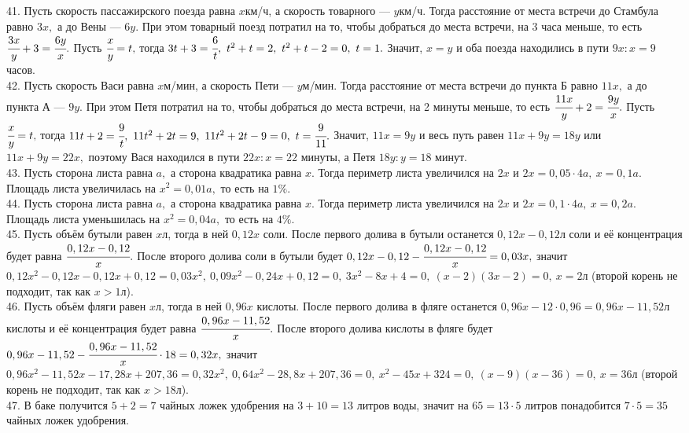 41. Пусть скорость пассажирского поезда равна $x$км/ч, а скорость товарного --- $y$км/ч. Тогда расстояние от места встречи до Стамбула равно $3x,$ а до Вены --- $6y.$ При этом товарный поезд потратил на то, чтобы добраться до места встречи, на 3 часа меньше, то есть $\cfrac{3x}{y}+3=\cfrac{6y}{x}.$ Пусть $\cfrac{x}{y}=t,$ тогда $3t+3=\cfrac{6}{t},\ t^2+t=2,\ t^2+t-2=0,\ t=1.$ Значит, $x=y$ и оба поезда находились в пути $9x:x=9$ часов.\\
42. Пусть скорость Васи равна $x$м/мин, а скорость Пети --- $y$м/мин. Тогда расстояние от места встречи до пункта Б равно $11x,$ а до пункта А --- $9y.$ При этом Петя потратил на то, чтобы добраться до места встречи, на 2 минуты меньше, то есть $\cfrac{11x}{y}+2=\cfrac{9y}{x}.$ Пусть $\cfrac{x}{y}=t,$ тогда $11t+2=\cfrac{9}{t},\ 11t^2+2t=9,\ 11t^2+2t-9=0,\ t=\cfrac{9}{11}.$ Значит, $11x=9y$ и весь путь равен $11x+9y=18y$ или $11x+9y=22x,$ поэтому Вася находился в пути $22x:x=22$ минуты, а Петя $18y:y=18$ минут.\\
43. Пусть сторона листа равна $a,$ а сторона квадратика равна $x.$ Тогда периметр листа увеличился на $2x$ и $2x=0,05\cdot4a,\ x=0,1a.$ Площадь листа увеличилась на $x^2=0,01a,$ то есть на $1\%.$\\
44. Пусть сторона листа равна $a,$ а сторона квадратика равна $x.$ Тогда периметр листа увеличился на $2x$ и $2x=0,1\cdot4a,\ x=0,2a.$ Площадь листа уменьшилась на $x^2=0,04a,$ то есть на $4\%.$\\
45. Пусть объём бутыли равен $x$л, тогда в ней $0,12x$ соли. После первого долива в бутыли останется $0,12x-0,12$л соли и её концентрация будет равна $\cfrac{0,12x-0,12}{x}.$ После второго долива соли в бутыли будет $0,12x-0,12-\cfrac{0,12x-0,12}{x}=0,03x,$ значит $0,12x^2-0,12x-0,12x+0,12=0,03x^2,\ 0,09x^2-0,24x+0,12=0,\ 3x^2-8x+4=0,\ (x-2)(3x-2)=0,\ x=2$л (второй корень не подходит, так как $x>1$л).\\
46. Пусть объём фляги равен $x$л, тогда в ней $0,96x$ кислоты. После первого долива в фляге останется $0,96x-12\cdot0,96=0,96x-11,52$л кислоты и её концентрация будет равна $\cfrac{0,96x-11,52}{x}.$ После второго долива кислоты в фляге будет $0,96x-11,52-\cfrac{0,96x-11,52}{x}\cdot18=0,32x,$ значит $0,96x^2-11,52x-17,28x+207,36=0,32x^2,\ 0,64x^2-28,8x+207,36=0,\ x^2-45x+324=0,\ (x-9)(x-36)=0,\ x=36$л (второй корень не подходит, так как $x>18$л).\\
47. В баке получится $5+2=7$ чайных ложек удобрения на $3+10=13$ литров воды, значит на $65=13\cdot5$ литров понадобится $7\cdot5=35$ чайных ложек удобрения.\\
